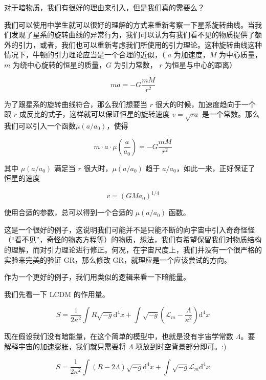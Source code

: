\documentclass[12pt,a4paper]{article}
\begin{document}
对于暗物质，我们有很好的理由来引入，但是我们真的需要么？

我们可以使用中学生就可以很好的理解的方式来重新考察一下星系旋转曲线。当我们发现了星系的旋转曲线的异常行为，我们可以认为有我们看不见的物质提供了额外的引力，或者，我们也可以重新考虑我们所使用的引力理论。这种旋转曲线这种情况下，牛顿的引力理论应当是一个合理的近似，（ $a$ 为加速度，$M$ 为中心质量，$m$ 为绕中心旋转的恒星的质量，$G$ 为引力常数， $r$ 为恒星与中心的距离）

\begin{equation}
m a = -G \frac{mM}{r^2}
\end{equation}

为了跟星系的旋转曲线符合，那么我们想要当 $r$ 很大的时候，加速度趋向于一个跟 $r$ 成反比的式子，这样就可以保证恒星的旋转速度 $v=\sqrt{r a}$ 是一个常数。那么我们可以引入一个函数$\mu(a/a_0)$，使得

\begin{equation}
m\cdot a \cdot \mu(\frac{a}{a_0}) = -G \frac{mM}{r^2}
\end{equation}

其中 $\mu(a/a_0)$ 满足当 $r$ 很大时，$\mu(a/a_0)$ 趋于 $a/a_0$，如此一来，正好保证了恒星的速度

\begin{equation}
v=\left( G M a_0 \right)^{1/4}
\end{equation}

使用合适的参数，总可以得到一个合适的 $\mu(a/a_0)$ 函数。

这是一个很好的例子，这说明我们可能并不是只能不断的向宇宙中引入奇奇怪怪（“看不见”，奇怪的物态方程等）的物质，想法，我们有希望保留我们对物质结构的理解，而对引力理论进行修正。何况，在宇宙尺度上，我们并没有一个很严格的实验来完美的验证 GR，那么修改 GR，就理应是一个应该尝试的方向。

作为一个更好的例子，我们用类似的逻辑来看一下暗能量。

我们先看一下 LCDM 的作用量。

\begin{equation}
S=\frac{1}{2\kappa^2}\int R \sqrt{-g}\mathrm d^4x+\int \sqrt{-g}(\mathcal L_m -\frac{\Lambda}{\kappa^2}) \mathrm d^4x
\end{equation}

现在假设我们没有暗能量，在这个简单的模型中，也就是没有宇宙学常数 $\Lambda$。要解释宇宙的加速膨胀，我们就只需要将 $\Lambda$ 项放到时空背景部分即可。:)

\begin{equation}
S=\frac{1}{2\kappa^2}\int (R-2\Lambda) \sqrt{-g}\mathrm d^4x+\int \sqrt{-g}\mathcal L_m \mathrm d^4x
\end{equation}
\end{document}
